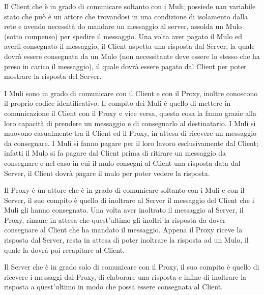 \item Il Client che è in grado di comunicare soltanto con i Muli; possiede uan variabile stato che può                  è un attore che trovandosi in una condizione di isolamento dalla rete e avendo necessità do mandare un messaggio al server, assolda un Mulo (sotto compenso) per spedire il messaggio. Una volta aver pagato il Mulo ed averli consegnato il messaggio, il Client aspetta una risposta dal Server, la quale dovrà essere consegnata da un Mulo (non necessitante deve essere lo stesso che ha preso in carico il messaggio), il quale dovrà essere pagato dal Client per poter mostrare la risposta del Server.

\item I Muli sono in grado di comunicare con il Client e con il Proxy, inoltre conoscono il proprio codice identificativo. Il compito dei Muli è  quello di mettere in comunicazione il Client con il Proxy e vice versa, questa cosa la fanno grazie alla loro capacità di prendere un messaggio e di consegnarlo al destinatario. I Muli si muovono casualmente tra il Client ed il Proxy, in attesa di ricevere un messaggio da consegnare. I Muli si fanno pagare per il loro lavoro esclusivamente dal Client; infatti il Mulo si fa pagare dal Client prima di ritirare un messaggio da consegnare e nel caso in cui il mulo consegni al Client una risposta data dal Server, il Client dovrà pagare il mulo per poter vedere la risposta.

\item Il Proxy è un attore che è in grado di comunicare soltanto con i Muli e con il Server, il suo compito è quello di inoltrare al Server il messaggio del Client che i Muli gli hanno consegnato. Una volta aver inoltrato il messaggio al Server, il Proxy, rimane in attesa che quest'ultimo gli inoltri la risposta da dover consegnare al Client che ha mandato il messaggio. Appena il Proxy riceve la risposta dal Server, resta in attesa di poter inoltrare la risposta ad un Mulo, il quale la dovrà poi recapitare al Client.

\item Il Server che è in grado solo di comunicare con il Proxy, il suo compito è quello di ricevere i messaggi dal Proxy, di elaborare una risposta e infine di inoltrare la risposta a quest'ultimo in modo che possa essere consegnata al Client.